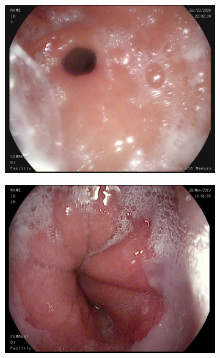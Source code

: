 \begin{figure}[h!]
\begin{subfigure}[b]{0.4\textwidth}
            \caption[]%
            {{\small }}    
            \label{fig:zGAN}
        \end{subfigure}
        \qquad
        \begin{subfigure}[b]{0.4\textwidth}
            \centering
            \includegraphics[width=\textwidth]{experiments/images/normal-pylorus.jpg}
            \caption[Is this in use]%
            {{\small  }}    
            \label{fig:polypAEGREEN}
        \end{subfigure}
        \qquad
        \begin{subfigure}[b]{0.4\textwidth}  
            \centering 
            \includegraphics[width=\textwidth]{experiments/images/normal-z-line.jpg}

\end{subfigure}
\end{figure}
